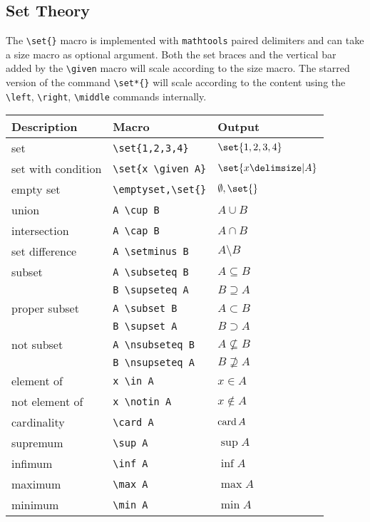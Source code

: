 \documentclass[DIV=13]{scrartcl}
\begin{document}
\subsection{Set Theory}
The \verb|\set{}| macro is implemented with \texttt{mathtools}
paired delimiters and can take a size macro as optional argument.
Both the set braces and the vertical bar added by the \verb|\given| macro
will scale according to the size macro. The starred version of the command
\verb|\set*{}| will scale according to the content using the \verb|\left|,
\verb|\right|, \verb|\middle| commands internally.
\begin{center}
  \begin{tabular}{lll}
    \toprule
    \textbf{Description} & \textbf{Macro}          & \textbf{Output}    \\
    \midrule
    set                  & \verb|\set{1,2,3,4}|    & $\set{1,2,3,4}$    \\
    set with condition   & \verb|\set{x \given A}| & $\set{x \given A}$ \\
    empty set            & \verb|\emptyset,\set{}| & $\emptyset,\set{}$ \\
    \midrule
    union                & \verb|A \cup B|         & $A \cup B$         \\
    intersection         & \verb|A \cap B|         & $A \cap B$         \\
    set difference       & \verb|A \setminus B|    & $A \setminus B$    \\
    subset               & \verb|A \subseteq B|    & $A \subseteq B$    \\
                         & \verb|B \supseteq A|    & $B \supseteq A$    \\
    proper subset        & \verb|A \subset B|      & $A \subset B$      \\
                         & \verb|B \supset A|      & $B \supset A$      \\
    not subset           & \verb|A \nsubseteq B|   & $A \nsubseteq B$   \\
                         & \verb|B \nsupseteq A|   & $B \nsupseteq A$   \\
    element of           & \verb|x \in A|          & $x \in A$          \\
    not element of       & \verb|x \notin A|       & $x \notin A$       \\
    \midrule
    cardinality          & \verb|\card A|          & $\operatorname{card} A$          \\
    supremum             & \verb|\sup A|           & $\sup A$           \\
    infimum              & \verb|\inf A|           & $\inf A$           \\
    maximum              & \verb|\max A|           & $\max A$           \\
    minimum              & \verb|\min A|           & $\min A$           \\
    \bottomrule
  \end{tabular}
\end{center}
\end{document}
